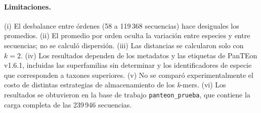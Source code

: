 \paragraph{Limitaciones.}
(i) El desbalance entre órdenes (58 a 119\,368 secuencias) hace desiguales
los promedios. (ii) El promedio por orden oculta la variación entre
especies y entre secuencias; no se calculó dispersión. (iii) Las
distancias se calcularon solo con $k=2$. (iv) Los resultados dependen de
los metadatos y las etiquetas de PanTEon v1.6.1, incluidas las
superfamilias sin determinar y los identificadores de especie que
corresponden a taxones superiores. (v) No se comparó experimentalmente el
costo de distintas estrategias de almacenamiento de los \textit{k}-mers.
(vi) Los resultados se obtuvieron en la base de trabajo
\texttt{panteon\_prueba}, que contiene la carga completa de las 239\,946
secuencias.